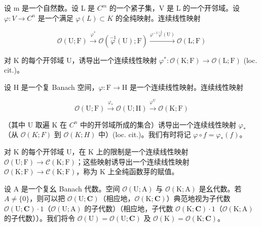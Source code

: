 设 m 是一个自然数。设 L 是 \(C^{m}\) 的一个紧子集，V 是 L 的一个开邻域。设 \(\varphi\colon V \to C^{n}\) 是一个满足 \(\varphi(L) \subset K\) 的全纯映射。连续线性映射

\[
\mathcal {O} (\mathrm{U}; \mathrm{F}) \xrightarrow {\varphi^ {*}} \mathcal {O} (\stackrel {- 1} {\varphi} (\mathrm{U}); \mathrm{F}) \xrightarrow {\varphi^ {- 1} \stackrel {- 1} {\varphi} (\mathrm{U})} \mathcal {O} (\mathrm{L}; \mathrm{F})
\]

对 K 的每个开邻域 U，诱导出一个连续线性映射 \(\varphi^{*}\colon\mathcal{O}(\mathrm{K};\mathrm{F})\to\mathcal{O}(\mathrm{L};\mathrm{F})\) (loc. cit.)。

设 H 是一个复 Banach 空间，\(\varphi\colon\mathrm{F}\to\mathrm{H}\) 是一个连续线性映射。连续线性映射

\[
\mathcal {O} (\mathrm{U}; \mathrm{F}) \xrightarrow {\varphi_ {*}} \mathcal {O} (\mathrm{U}; \mathrm{H}) \xrightarrow {\varphi^ {\mathrm{U}}} \mathcal {O} (\mathrm{K}; \mathrm{F})
\]

（其中 U 取遍 K 在 \(C^{n}\) 中的开邻域所成的集合）诱导出一个连续线性映射 \(\varphi_{*}\)（从 \(\mathcal{O}(K;F)\) 到 \(\mathcal{O}(K;H)\) 中）(loc. cit.)。我们有时将记 \(\varphi \circ f = \varphi_{*}(f)\)。

对 K 的每个开邻域 U，在 K 上的限制是一个连续线性映射 \(\mathcal{O}(\mathrm{U};\mathrm{F})\to \mathcal{C}(\mathrm{K};\mathrm{F})\)；这些映射诱导出一个连续线性映射 \(\mathcal{O}(\mathrm{K};\mathrm{F})\to \mathcal{C}(\mathrm{K};\mathrm{F})\)，称为 K 上全纯函数芽的赋值。

设 A 是一个复幺 Banach 代数。空间 \(\mathcal{O}(\mathrm{U};\mathrm{A})\) 与 \(\mathcal{O}(\mathrm{K};\mathrm{A})\) 是幺代数。若 \(A \neq \{0\}\)，则可以把 \(\mathcal{O}(\mathrm{U};\mathbf{C})\)（相应地，\(\mathcal{O}(\mathrm{K};\mathbf{C})\)）典范地视为子代数 \(\mathcal{O}(\mathrm{U};\mathbf{C}) \cdot 1\)（\(\mathcal{O}(\mathrm{U};\mathrm{A})\) 的子代数）（相应地，子代数 \(\mathcal{O}(\mathrm{K};\mathbf{C}) \cdot 1\)（\(\mathcal{O}(\mathrm{K};\mathrm{A})\) 的子代数））。我们将令 \(\mathcal{O}(\mathrm{U}) = \mathcal{O}(\mathrm{U};\mathbf{C})\) 及 \(\mathcal{O}(\mathrm{K}) = \mathcal{O}(\mathrm{K};\mathbf{C})\)。


